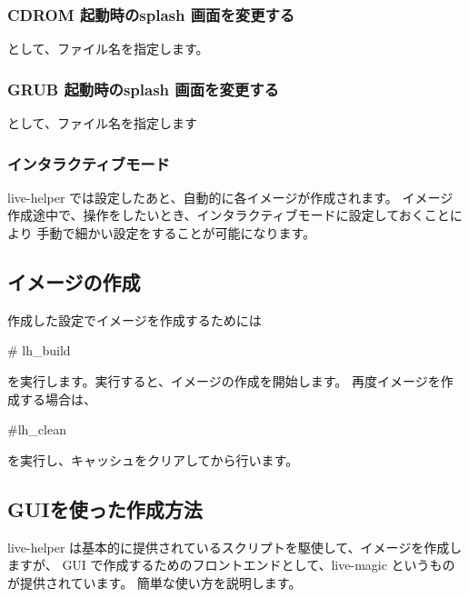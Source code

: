 \documentclass[mingoth,a4paper]{jsarticle}
\begin{document}
\subsubsection{CDROM 起動時のsplash 画面を変更する}

\begin{commandline}
\end{commandline}
として、ファイル名を指定します。

\subsubsection{GRUB 起動時のsplash 画面を変更する}

\begin{commandline}
\end{commandline}
として、ファイル名を指定します

\subsubsection{インタラクティブモード}
live-helper では設定したあと、自動的に各イメージが作成されます。
イメージ作成途中で、操作をしたいとき、インタラクティブモードに設定しておくことにより
手動で細かい設定をすることが可能になります。

\begin{commandline}
\end{commandline}


\subsection{イメージの作成}
作成した設定でイメージを作成するためには

\begin{commandline}
# lh_build
\end{commandline}

を実行します。実行すると、イメージの作成を開始します。
再度イメージを作成する場合は、
\begin{commandline}
#lh_clean
\end{commandline}
を実行し、キャッシュをクリアしてから行います。

\subsection{GUIを使った作成方法}
live-helper は基本的に提供されているスクリプトを駆使して、イメージを作成しますが、
GUI で作成するためのフロントエンドとして、live-magic というものが提供されています。
簡単な使い方を説明します。
\end{document}
